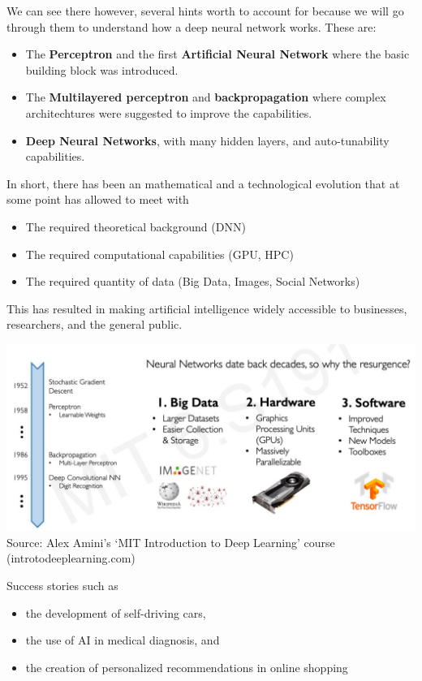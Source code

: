 \documentclass[
  letterpaper,
  DIV=11,
  numbers=noendperiod,
  oneside]{scrartcl}
\begin{document}
We can see there however, several hints worth to account for because we
will go through them to understand how a deep neural network works.
These are:

\begin{itemize}
\item
  The \textbf{Perceptron} and the first \textbf{Artificial Neural
  Network} where the basic building block was introduced.
\item
  The \textbf{Multilayered perceptron} and \textbf{backpropagation}
  where complex architechtures were suggested to improve the
  capabilities.
\item
  \textbf{Deep Neural Networks}, with many hidden layers, and
  auto-tunability capabilities.
\end{itemize}

In short, there has been an mathematical and a technological evolution
that at some point has allowed to meet with

\begin{itemize}
\item
  The required theoretical background (DNN)
\item
  The required computational capabilities (GPU, HPC)
\item
  The required quantity of data (Big Data, Images, Social Networks)
\end{itemize}

This has resulted in making artificial intelligence widely accessible to
businesses, researchers, and the general public.

\includegraphics[width=1\textwidth,height=\textheight]{images/WhyDLNow.png}
Source: Alex Amini's `MIT Introduction to Deep Learning' course
(introtodeeplearning.com)

Success stories such as

\begin{itemize}
\item
  the development of self-driving cars,
\item
  the use of AI in medical diagnosis, and
\item
  the creation of personalized recommendations in online shopping
\end{itemize}
\end{document}
